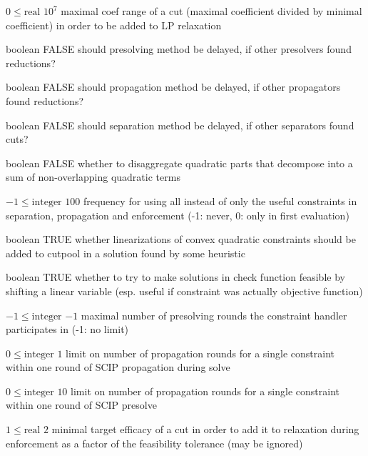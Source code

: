 %
{$0\leq\textrm{real}$}%
{$10^{  7}$}%
{maximal coef range of a cut (maximal coefficient divided by minimal coefficient) in order to be added to LP relaxation}%
{}

%
{boolean}%
{FALSE}%
{should presolving method be delayed, if other presolvers found reductions?}%
{}

%
{boolean}%
{FALSE}%
{should propagation method be delayed, if other propagators found reductions?}%
{}

%
{boolean}%
{FALSE}%
{should separation method be delayed, if other separators found cuts?}%
{}

%
{boolean}%
{FALSE}%
{whether to disaggregate quadratic parts that decompose into a sum of non-overlapping quadratic terms}%
{}

%
{$-1\leq\textrm{integer}$}%
{$100$}%
{frequency for using all instead of only the useful constraints in separation, propagation and enforcement (-1: never, 0: only in first evaluation)}%
{}

%
{boolean}%
{TRUE}%
{whether linearizations of convex quadratic constraints should be added to cutpool in a solution found by some heuristic}%
{}

%
{boolean}%
{TRUE}%
{whether to try to make solutions in check function feasible by shifting a linear variable (esp. useful if constraint was actually objective function)}%
{}

%
{$-1\leq\textrm{integer}$}%
{$-1$}%
{maximal number of presolving rounds the constraint handler participates in (-1: no limit)}%
{}

%
{$0\leq\textrm{integer}$}%
{$1$}%
{limit on number of propagation rounds for a single constraint within one round of SCIP propagation during solve}%
{}

%
{$0\leq\textrm{integer}$}%
{$10$}%
{limit on number of propagation rounds for a single constraint within one round of SCIP presolve}%
{}

%
{$1\leq\textrm{real}$}%
{$2$}%
{minimal target efficacy of a cut in order to add it to relaxation during enforcement as a factor of the feasibility tolerance (may be ignored)}%
{}


